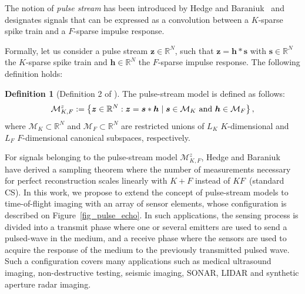 \documentclass{article}
\newcommand{\etal}{\textit{et al.}}
\newcommand{\vect}[1]{\bm{#1}}
\theoremstyle{definition}
\newtheorem{defn}{Definition}
\begin{document}
The notion of \textit{pulse stream} has been introduced by Hedge and Baraniuk~\cite{Hedge_TSP_2011} and designates signals that can be expressed as a convolution between a $K$-sparse spike train and a $F$-sparse impulse response. 
%
%

Formally, let us consider a pulse stream $\vect{z} \in \mathbb{R}^N$, such that $\vect{z} = \vect{h} \ast \vect{s}$ with $\vect{s} \in \mathbb{R}^N$ the $K$-sparse spike train and $\vect{h} \in \mathbb{R}^N$ the $F$-sparse impulse response. 
The following definition holds:
\begin{defn}[Definition 2 of \cite{Hedge_TSP_2011}]	
The pulse-stream model is defined as follows:
\begin{equation}
\label{eq_pulse_stream_model}
\mathcal{M}^z_{K,F}:=\left\lbrace \vect{z} \in \mathbb{R}^N: \vect{z} = \vect{s} \ast \vect{h} \; | \; \vect{s} \in \mathcal{M}_K \textnormal{ and } \vect{h} \in \mathcal{M}_F \right \rbrace,
\end{equation}
where $\mathcal{M}_K \subset \mathbb{R}^N$ and $\mathcal{M}_F \subset \mathbb{R}^N$ are restricted unions of $L_K$ $K$-dimensional and $L_F$ $F$-dimensional canonical subspaces, respectively.
\end{defn} 

For signals belonging to the pulse-stream model $\mathcal{M}^z_{K,F}$, Hedge and Baraniuk~\cite{Hedge_TSP_2011} have derived a sampling theorem where the number of measurements necessary for perfect reconstruction scales linearly with $K + F$ instead of $KF$~(standard CS). 
In this work, we propose to extend the concept of pulse-stream models to time-of-flight imaging with an array of sensor elements, whose configuration is described on Figure~\ref{fig_pulse_echo}. 
In such applications, the sensing process is divided into a transmit phase where one or several emitters are used to send a pulsed-wave in the medium, and a receive phase where the sensors are used to acquire the response of the medium to the previously transmitted pulsed wave. 
Such a configuration covers many applications such as medical ultrasound imaging, non-destructive testing, seismic imaging, SONAR, LIDAR and synthetic aperture radar imaging.
\end{document}
